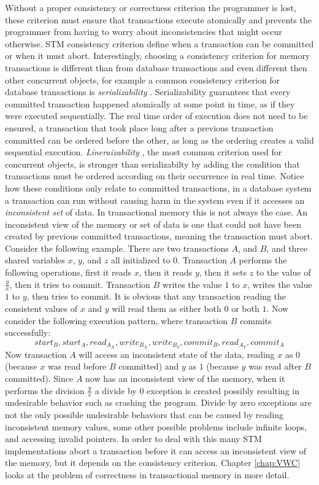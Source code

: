 Without a proper consistency or correctness criterion the programmer is lost, these criterion must ensure that transactions execute
atomically and prevents the programmer from having to worry about inconsistencies that might occur otherwise.
STM consistency criterion define when a transaction can be committed or when it must abort. 
Interestingly, choosing a consistency criterion for memory transactions is different than from database transactions
and even different then other concurrent objects,
for example a common consistency criterion for database transactions is \emph{serializability} \cite{P79}.  
Serializability guarantees that every committed transaction happened atomically at some point in time,
 as if they were executed sequentially.
The real time order of execution does not need to be ensured,
a transaction that took place long after a previous transaction committed can
 be ordered before the other, as long as the ordering creates a valid sequential execution.
\emph{Lineraizability} \cite{HW90}, the most common criterion used for concurrent objects, is stronger than serializabilty by
adding the condition that transactions must be ordered according on their occurrence in real time.
Notice how these conditions only relate to committed transactions, in a database
system a transaction can run without causing harm in the system even if it 
accesses an \emph{inconsistent set} of data.
In transactional memory this is not always the case.
An inconsistent view of the memory or set of data is one that could not have been
created by previous committed transactions, meaning the transaction must abort.
Consider the following example.  There are two transactions $A$, and $B$, and three 
shared variables $x$, $y$, and $z$ all initialized to $0$.  Transaction $A$ performs
the following operations, first it reads $x$, then it reads $y$, then it sets $z$ to 
the value of $\frac{y}{x}$, then it tries to commit.
Transaction $B$ writes the value $1$ to $x$, writes the value $1$ to $y$, 
then tries to commit.
It is obvious that any transaction reading the consistent values of $x$ and $y$ 
will read them as either both $0$ or both $1$.
Now consider the following execution pattern, where transaction $B$ commits successfully:
$$start_{B}, start_{A}, read_{A_{X}}, write_{B_{X}}, write_{B_{Y}}, commit_{B}, read_{A_{Y}}, commit_{A}$$
Now transaction $A$ will access an inconsistent state of the data, reading $x$ as
$0$ (because $x$ was read before $B$ committed) and $y$ as $1$ (because $y$ was read after $B$ committed).
Since $A$ now has an inconsistent view of the memory, when it performs the division 
$\frac{y}{x}$ a divide by $0$ exception is created possibly resulting in undesirable
 behavior such as crashing the program.
Divide by zero exceptions are not the only possible undesirable behaviors that can
 be caused by reading inconsistent memory values, some other possible problems include 
infinite loops, and accessing invalid pointers.
In order to deal with this many STM implementations abort a transaction before it
 can access an inconsistent view of the memory, but it depends on the consistency criterion.
Chapter \ref{chap:VWC} looks at the problem of correctness in transactional memory in more detail.


